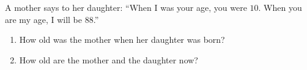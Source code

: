 A mother says to her daughter: ``When I was your age, you were $10$. When you are my age, I will be $88$.''
\begin{enumerate}
\item[(a)] How old was the mother when her daughter was born?
\item[(b)] How old are the mother and the daughter now?
\end{enumerate}
